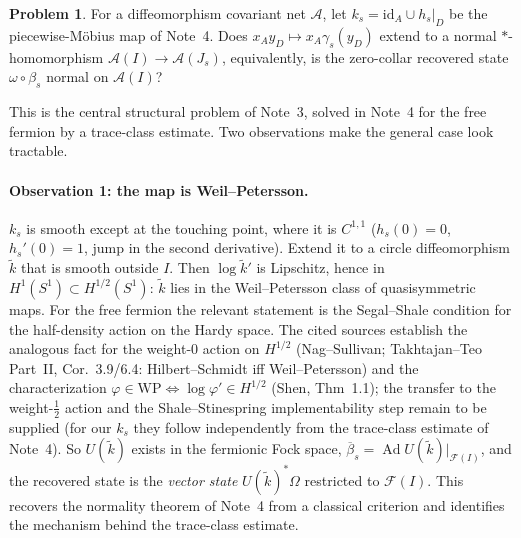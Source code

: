 \documentclass[11pt]{article}
\theoremstyle{accent}
\theoremstyle{definition}
\newcommand{\cF}{\mathcal{F}}
\newcommand{\cA}{\mathcal{A}}
\newtheorem{problem}[theorem]{Problem}
\begin{document}
\begin{problem}
For a diffeomorphism covariant net \(\cA\), let \(k_s=\mathrm{id}_A\cup h_s|_D\) be the piecewise-M\"obius map of Note~4.  Does \(x_Ay_D\mapsto x_A\gamma_s(y_D)\) extend to a normal \(*\)-homomorphism \(\cA(I)\to\cA(J_s)\), equivalently, is the zero-collar recovered state \(\omega\circ\beta_s\) normal on \(\cA(I)\)?
\end{problem}

This is the central structural problem of Note~3, solved in Note~4 for the free fermion by a trace-class estimate.  Two observations make the general case look tractable.

\paragraph{Observation 1: the map is Weil--Petersson.}
\(k_s\) is smooth except at the touching point, where it is \(C^{1,1}\) (\(h_s(0)=0\), \(h_s'(0)=1\), jump in the second derivative).  Extend it to a circle diffeomorphism \(\widetilde k\) that is smooth outside \(I\).  Then \(\log\widetilde k'\) is Lipschitz, hence in \(H^1(S^1)\subset H^{1/2}(S^1)\): \(\widetilde k\) lies in the Weil--Petersson class of quasisymmetric maps.  For the free fermion the relevant statement is the Segal--Shale condition for the half-density action on the Hardy space.  The cited sources establish the analogous fact for the weight-0 action on \(H^{1/2}\) (Nag--Sullivan; Takhtajan--Teo Part~II, Cor.~3.9/6.4: Hilbert--Schmidt iff Weil--Petersson) and the characterization \(\varphi\in\mathrm{WP}\iff\log\varphi'\in H^{1/2}\) (Shen, Thm~1.1); the transfer to the weight-\(\frac12\) action and the Shale--Stinespring implementability step remain to be supplied (for our \(k_s\) they follow independently from the trace-class estimate of Note~4).  So \(U(\widetilde k)\) exists in the fermionic Fock space, \(\overline\beta_s=\operatorname{Ad}U(\widetilde k)|_{\cF(I)}\), and the recovered state is the \emph{vector state} \(U(\widetilde k)^*\Omega\) restricted to \(\cF(I)\).  This recovers the normality theorem of Note~4 from a classical criterion and identifies the mechanism behind the trace-class estimate.
\end{document}
